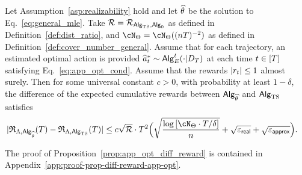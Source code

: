 \begin{proposition}\label{prop:app_opt_diff_reward} Let Assumption~\ref{asp:realizability} hold and let ${\widehat{\theta}}$ be the solution to Eq.~\eqref{eq:general_mle}. Take ${\mathcal{R}} = {\mathcal{R}}_{{\mathsf{Alg}}_{\mathrm{TS}},{\mathsf{Alg}}_0}$ as defined in Definition~\ref{def:dist_ratio}, and $\cN_{\Parspace} = \cN_{\Parspace}((\Numobs\totlen)^{-2})$  as defined in Definition~\ref{def:cover_number_general}. Assume that for each trajectory, an estimated optimal action is provided $\widehat{{a}}_t^* \sim {\mathsf{Alg}}_{{E}}^t(\cdot | {D}_{T})$ at each time $t\in[{T}]$ satisfying Eq.~\eqref{eq:app_opt_cond}. 
Assume that the rewards $|{r}_t|\leq 1$  almost surely. Then for some universal constant $c>0$, with probability at least $1-\delta$, the difference of the expected cumulative rewards between ${\mathsf{Alg}}_{\widehat{\theta}}$ and ${\mathsf{Alg}}_{\mathrm{TS}}$ satisfies 
\begin{align*}
|\totreward_{\prior,\sAlg_\EstPar}(\totlen)-\totreward_{\prior,\sAlg_\TS}(\totlen)|
&\leq 
c \sqrt{\distratio}\cdot\totlen^2 \Big( \sqrt{\frac{\log \brac{ \cN_{\Parspace} \cdot \totlen/\delta } }{n} } + \sqrt{\geneps} + \sqrt{\appeps} \Big). 
\end{align*}
\end{proposition}
The proof of Proposition~\ref{prop:app_opt_diff_reward} is contained in Appendix~\ref{app:proof-prop-diff-reward-app-opt}. 





